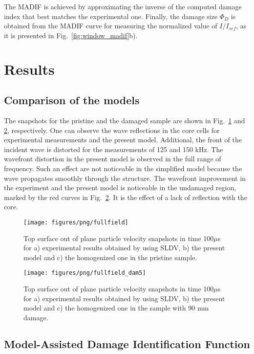 \documentclass[sensors,article,submit,moreauthors,pdftex]{Definitions/mdpi}
\begin{document}
The MADIF is achieved by approximating the inverse of the computed damage index that best matches the experimental one.
Finally, the damage size \(\Phi_D\) is obtained from the MADIF curve for measuring the normalized value of \(I/I_{ref}\), as it is presented in Fig.~\ref{fig:window_madif}b).
\section{Results}
\label{sec:results}
\subsection{Comparison of the models}
\label{comparison}
The snapshots for the pristine and the damaged sample are shown in Fig.~\ref{fig:wavefield} and \ref{fig:wavefield_dam5}, respectively.
One can observe the wave reflections in the core cells for experimental measurements and the present model. 
Additional, the front of the incident wave is distorted for the measurements of 125 and 150 kHz.
The wavefront distortion in the present model is observed in the full range of frequency. 
Such an effect are not noticeable in the simplified model because the wave propagates smoothly through the structure.
The wavefront improvement in the experiment and the present model is noticeable in the undamaged region, marked by the red curves in Fig.~\ref{fig:wavefield_dam5}.
It is the effect of a lack of reflection with the core.
\begin{figure}
	\begin{center}
		\texttt{[image: figures/png/fullfield]}
	\end{center}
	\caption{Top surface out of plane particle velocity snapshots in time 100\(\mu\)s for a) experimental results obtained by using SLDV, b) the present model and c) the homogenized one in the pristine sample.}
	\label{fig:wavefield}
\end{figure}
\begin{figure}
	\begin{center}
		\texttt{[image: figures/png/fullfield\_dam5]}
	\end{center}
	\caption{Top surface out of plane particle velocity snapshots in time 100\(\mu\)s for a) experimental results obtained by using SLDV, b) the present model and c) the homogenized one in the sample with 90 mm damage.}
	\label{fig:wavefield_dam5}
\end{figure}
\subsection{Model-Assisted Damage Identification Function}
\label{MADIF}
\end{document}
